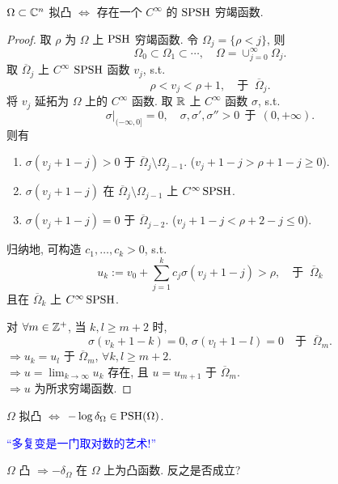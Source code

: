 \begin{proposition}
     $\Omega \subset {\mathbb C}^n$ 拟凸 $\iff $  存在一个 $C^{\infty }$ 的 $\operatorname{SPSH}$ 穷竭函数. 
\end{proposition}
\begin{proof}
    取 $\rho $ 为 $\Omega $ 上 $\operatorname{PSH}$ 穷竭函数. 
    令 $\Omega _j=\{\rho <j\}$, 则 
    $$ \Omega _0 \subset \Omega _1 \subset \cdots , \quad \Omega =\cup _{j=0}^{\infty } \Omega _j. $$    
    取 $\overline{\Omega} _j$ 上 $C^{\infty }$ $\operatorname{SPSH}$ 函数 $v_j$, s.t. 
    $$ \rho <v_j<\rho +1, \quad \text{于 }~ \overline{\Omega} _j .$$  
    将 $v_j$ 延拓为 $\Omega $ 上的 $C^{\infty } $ 函数. 
    取 ${\mathbb R}$ 上 $C^{\infty }$   函数 $\sigma $, s.t. 
    $$ \sigma |_{(- \infty ,0]} =0, \quad \sigma ,\sigma ', \sigma '' >0 ~~ \text{于} ~~ (0,+\infty ).$$   
    则有 
    \begin{enumerate}
        \item $\sigma (v_j+1-j)>0$ 于 $\overline{\Omega }_j \setminus \Omega_{j-1}$. ($v_j+1-j>\rho +1-j \geq 0$).
        \item $\sigma (v_j+1-j)$ 在  $\overline{\Omega }_j \setminus \Omega_{j-1}$ 上 $C^{\infty } \operatorname{SPSH}$.
        \item $\sigma (v_j+1-j)=0$ 于 $\overline{\Omega} _{j-2}$. ($v_j+1-j < \rho +2-j \leq 0$).   
    \end{enumerate}
   归纳地, 可构造 $c_1,\dots,c_k>0$, s.t. 
   $$ u_k:=v_0+\sum_{j=1}^{k} c_j \sigma (v_j+1-j) >\rho , \quad \text{于 }~ \overline{\Omega} _k $$ 
   且在 $\overline{\Omega} _k$ 上  $C^{\infty } \operatorname{SPSH}$.   

   对 $\forall m \in {\mathbb Z}^{+}$, 当 $k,l \geq m+2$ 时, 
   $$ \sigma (v_k+1-k)=0,\, \sigma (v_l+1-l)=0 \quad \text{于 } ~ \overline{\Omega }_m .$$  
   $\Rightarrow u_k=u_l$ 于 $\overline{\Omega }_m$, $\forall k,l \geq m+2$.\\
   $\Rightarrow u=\lim_{k \to \infty }u_k$ 存在, 且 $u=u_{m+1}$ 于 $\overline{\Omega }_m$.\\
    $\Rightarrow u$ 为所求穷竭函数. 
\end{proof}

\begin{theorem}[Oka]\label{thm3.1}
    $\Omega $ 拟凸 $\iff $ $-\log \delta _{\Omega } \in \operatorname{PSH}(\Omega )$.   
\end{theorem}
\begin{remark}
    \textcolor{blue}{``多复变是一门取对数的艺术!''}
\end{remark}
\begin{remark}
    $\Omega $ 凸 $\Rightarrow -\delta _{\Omega }$ 在 $\Omega $ 上为凸函数. 反之是否成立?   
\end{remark}

